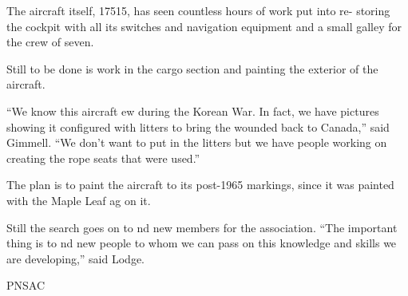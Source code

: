 The aircraft itself, 17515, has seen countless hours of work put into
re- storing the cockpit with all its switches and navigation
equipment and a small galley for the crew of seven.

Still to be done is work in the cargo section and painting the
exterior of the aircraft.

“We know this aircraft ew during the Korean War. In fact, we have 
pictures showing it configured with litters to bring the wounded back to
Canada,” said Gimmell. “We don’t want to put in the litters but we
have people working on creating the rope seats that were used.”

The plan is to paint the aircraft to its post-1965 markings, since it
was painted with the Maple Leaf ag on it.

Still the search goes on to nd new members for the association. “The
important thing is to nd new people to whom we can pass on this 
knowledge and skills we are developing,” said Lodge.












\begin{footnotesize}
    \raggedleft PNSAC\\
\end{footnotesize}



